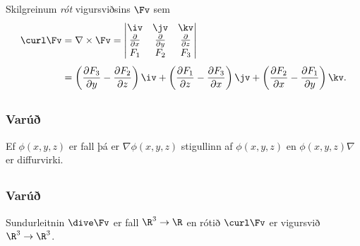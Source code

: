 Skilgreinum {\em rót}  vigursviðsins $\Fv$ sem 
 \begin{align*}
 \curl\Fv&=\nabla\times\Fv =\begin{vmatrix} \iv&\jv&\kv\\
 \frac{\partial} {\partial x}&\frac{\partial}{\partial y}&\frac{\partial}{\partial z}\\F_1&F_2&F_3\end{vmatrix} \\
 \noalign{\smallskip}
 &=\bigg(\frac{\partial F_3}{\partial y}-\frac{\partial F_2}{\partial
 z}\bigg)\,\iv+\bigg(\frac{\partial F_1}{\partial z}-\frac{\partial
 F_3}{\partial x}\bigg)\,\jv+\bigg(\frac{\partial F_2}{\partial
 x}-\frac{\partial F_1}{\partial y}\bigg)\,\kv. 
 \end{align*}







\subsection{} 

\subsubsection{Varúð \rtask{}}
  Ef $\phi(x,y,z)$ er fall þá er $\nabla \phi(x,y,z)$ 
stigullinn af $\phi(x,y,z)$ en $\phi(x,y,z)\nabla$ er diffurvirki.







\subsection{} 

\subsubsection{Varúð \rtask{}}
 Sundurleitnin $\dive\Fv$ er fall $\R^3\rightarrow\R$ en rótið $\curl\Fv$ er vigursvið $\R^3\rightarrow\R^3$.







\subsection{} 

